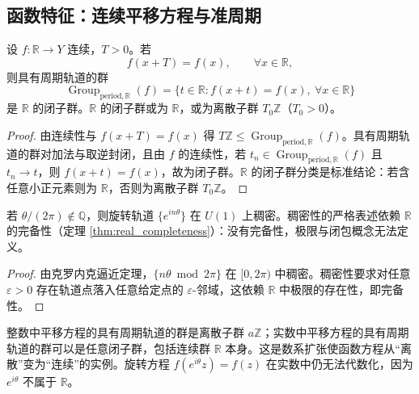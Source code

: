 \subsection{\texorpdfstring{函数特征：连续平移方程与准周期}{函数特征：连续平移方程与准周期}}

\begin{theorem}[实数连续平移方程的具有周期轨道的群]\label{thm:translation_equation_R}
设 $f:\mathbb{R}\to Y$ 连续，$T>0$。若
\[
f(x+T)=f(x),\qquad \forall x\in\mathbb{R},
\]
则具有周期轨道的群
\[
\operatorname{Group}_{\mathrm{period},\mathbb{R}}(f)=\{t\in\mathbb{R}: f(x+t)=f(x),\ \forall x\in\mathbb{R}\}
\]
是 $\mathbb{R}$ 的闭子群。$\mathbb{R}$ 的闭子群或为 $\mathbb{R}$，或为离散子群 $T_0\mathbb{Z}$（$T_0>0$）。
\end{theorem}

\begin{proof}
由连续性与 $f(x+T)=f(x)$ 得 $T\mathbb{Z}\le\operatorname{Group}_{\mathrm{period},\mathbb{R}}(f)$。具有周期轨道的群对加法与取逆封闭，且由 $f$ 的连续性，若 $t_n\in\operatorname{Group}_{\mathrm{period},\mathbb{R}}(f)$ 且 $t_n\to t$，则 $f(x+t)=f(x)$，故为闭子群。$\mathbb{R}$ 的闭子群分类是标准结论：若含任意小正元素则为 $\mathbb{R}$，否则为离散子群 $T_0\mathbb{Z}$。
\end{proof}

\begin{proposition}[准周期轨道与完备性]\label{prop:quasi_period_R}
若 $\theta/(2\pi)\notin\mathbb{Q}$，则旋转轨道 $\{e^{in\theta}\}$ 在 $U(1)$ 上稠密。稠密性的严格表述依赖 $\mathbb{R}$ 的完备性（定理 \ref{thm:real_completeness}）：没有完备性，极限与闭包概念无法定义。
\end{proposition}

\begin{proof}
由克罗内克逼近定理，$\{n\theta\bmod 2\pi\}$ 在 $[0,2\pi)$ 中稠密。稠密性要求对任意 $\varepsilon>0$ 存在轨道点落入任意给定点的 $\varepsilon$-邻域，这依赖 $\mathbb{R}$ 中极限的存在性，即完备性。
\end{proof}

\begin{remark}\label{rem:real_makes_translation_continuous}
整数中平移方程的具有周期轨道的群是离散子群 $a\mathbb{Z}$；实数中平移方程的具有周期轨道的群可以是任意闭子群，包括连续群 $\mathbb{R}$ 本身。这是数系扩张使函数方程从“离散”变为“连续”的实例。旋转方程 $f(e^{i\theta}z)=f(z)$ 在实数中仍无法代数化，因为 $e^{i\theta}$ 不属于 $\mathbb{R}$。
\end{remark}

